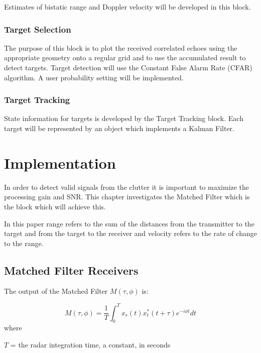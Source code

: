 \documentclass[a4paper]{report}
\numberwithin{equation}{chapter}
\begin{document}
\bigskip

Estimates of bistatic range and Doppler velocity will be developed in this block.

\subsection[Target Selection]{Target Selection}
The purpose of this block is to plot the
received correlated echoes using the appropriate geometry onto a
regular grid and to use the accumulated result to detect targets.
Target detection will use the Constant False Alarm Rate (CFAR)
algorithm. A user probability setting will be implemented.

\bigskip

\subsection[Target Tracking]{Target Tracking}
State information for targets is developed by
the Target Tracking block. Each target will be represented by an object
which implements a Kalman Filter.


\clearpage\setcounter{page}{1}
\chapter[Implementation]{Implementation}
In order to detect valid signals from the clutter it is important to maximize the processing gain and SNR. This chapter investigates the Matched Filter which is the block which will achieve this.

\bigskip

In this paper range refers to the sum of the distances from the transmitter to the target and from the target to the receiver and velocity refers to the rate of change to the range.

\section[Matched Filter Receivers]{Matched Filter Receivers}

The output of the Matched Filter $M(\tau, \phi)$ is:

\begin{equation}
M(\tau, \phi) = \frac{1}{T} \int_0^T x_r(t)x_t^*(t + \tau)e^{-i\phi t}dt
\label{eqn:matched_filter_analog}
\end{equation}
where

$T$ = the radar integration time, a constant, in seconds
\end{document}
